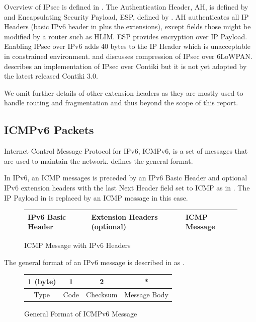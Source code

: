 \begin{description}[style=nextline]
\item[\textbf{IPsec}]
Overview of IPsec is defined in \cite{rfc4301}. The Authentication Header, AH, is defined by \cite{rfc4302} and Encapsulating Security Payload, ESP, defined by \cite{rfc4303}. AH authenticates all IP Headers (basic IPv6 header in  plus the extensions), except fields those might be modified by a router such as HLIM. ESP provides encryption over IP Payload. Enabling IPsec over IPv6 adds 40 bytes to the IP Header which is unacceptable in constrained environment. \cite{6LoWPANIPsec} and \cite{CompressIPsec} discusses compression of IPsec over 6LoWPAN. \cite{ContikiIPsec} describes an implementation of IPsec over Contiki but it is not yet adopted by the latest released Contiki 3.0.
\end{description}

We omit further details of other extension headers as they are mostly used to handle routing and fragmentation and thus beyond the scope of this report.

\subsection{ICMPv6 Packets} \label{Subsec: ICMPv6}
Internet Control Message Protocol for IPv6, ICMPv6, is a set of messages that are used to maintain the network. \cite{rfc4443} defines the general format. 

In IPv6, an ICMP messages is preceded by an IPv6 Basic Header and optional IPv6 extension headers with the last Next Header field set to ICMP as in . The IP Payload in  is replaced by an ICMP message in this case.

\begin{figure}[h!]
	\centering
	\begin{tabular}{|l|l|l|}
		\hline
		IPv6 Basic Header & Extension Headers (optional) & ICMP Message \\ \hline
	\end{tabular}
	\caption{ICMP Message with IPv6 Headers}
	\label{Fig: ICMP with IPv6}
\end{figure}

The general format of an IPv6 message is described in \cite{rfc4443} as .
\begin{figure}[h!]
	\centering
	\begin{tabular}{|c|c|c|c|}
	\hline
	1 (byte) & 1    & 2        & *            \\ \hline
	Type     & Code & Checksum & Message Body \\ \hline
	\end{tabular}
	\caption{General Format of ICMPv6 Message}
	\label{Fig: General Format of ICMPv6 Message}
\end{figure}

